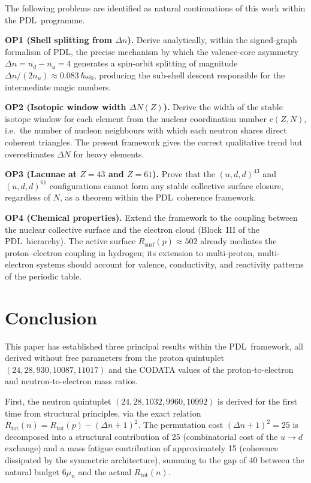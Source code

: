 \documentclass[11pt,a4paper]{article}
\theoremstyle{definition}
\newcommand{\PDL}{\textnormal{PDL}}
\newcommand{\Rsurf}{R_{\mathrm{surf}}}
\newcommand{\Rtot}{R_{\mathrm{tot}}}
\begin{document}
The following problems are identified as natural continuations of this work within the \PDL\ programme.

\medskip\noindent\textbf{OP1 (Shell splitting from $\Delta n$).} Derive analytically, within the signed-graph formalism of \PDL, the precise mechanism by which the valence-core asymmetry $\Delta n = n_d - n_u = 4$ generates a spin-orbit splitting of magnitude $\Delta n/(2n_u) \approx 0.083\,\hbar\omega_0$, producing the sub-shell descent responsible for the intermediate magic numbers.

\medskip\noindent\textbf{OP2 (Isotopic window width $\Delta N(Z)$).} Derive the width of the stable isotope window for each element from the nuclear coordination number $c(Z,N)$, i.e.\ the number of nucleon neighbours with which each neutron shares direct coherent triangles. The present framework gives the correct qualitative trend but overestimates $\Delta N$ for heavy elements.

\medskip\noindent\textbf{OP3 (Lacunae at $Z = 43$ and $Z = 61$).} Prove that the $(u,d,d)^{43}$ and $(u,d,d)^{61}$ configurations cannot form any stable collective surface closure, regardless of $N$, as a theorem within the \PDL\ coherence framework.

\medskip\noindent\textbf{OP4 (Chemical properties).} Extend the framework to the coupling between the nuclear collective surface and the electron cloud (Block~III of the \PDL\ hierarchy). The active surface $\Rsurf(p) \approx 502$ already mediates the proton--electron coupling in hydrogen; its extension to multi-proton, multi-electron systems should account for valence, conductivity, and reactivity patterns of the periodic table.

\section*{Conclusion}

This paper has established three principal results within the \PDL\ framework, all derived without free parameters from the proton quintuplet $(24, 28, 930, 10087, 11017)$ and the CODATA values of the proton-to-electron and neutron-to-electron mass ratios.

First, the neutron quintuplet $(24, 28, 1032, 9960, 10992)$ is derived for the first time from structural principles, via the exact relation $\Rtot(n) = \Rtot(p) - (\Delta n + 1)^2$. The permutation cost $(\Delta n+1)^2 = 25$ is decomposed into a structural contribution of 25 (combinatorial cost of the $u \to d$ exchange) and a mass fatigue contribution of approximately 15 (coherence dissipated by the symmetric architecture), summing to the gap of 40 between the natural budget $6\mu_n$ and the actual $\Rtot(n)$.
\end{document}

